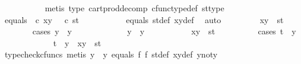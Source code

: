 \begin{isabellebody}
\ \ \ \ \ \ \ \ \ \isamarkupfalse%
\ {\isacharparenleft}{\kern0pt}metis\ {\isasymTheta}{\isacharunderscore}{\kern0pt}type\ cart{\isacharunderscore}{\kern0pt}prod{\isacharunderscore}{\kern0pt}decomp\ cfunc{\isacharunderscore}{\kern0pt}type{\isacharunderscore}{\kern0pt}def\ st{\isacharunderscore}{\kern0pt}type{\isacharparenright}{\kern0pt}\ \ \ \isanewline
\ \ \ \ \ \ \ \isamarkupfalse%
\ equals{}{\isacharcolon}{\kern0pt}\ {\isachardoublequoteopen}{\isasymTheta}\ {\isasymcirc}\isactrlsub c\ {\isasymlangle}x{\isacharcomma}{\kern0pt}y{\isasymrangle}\ {\isacharequal}{\kern0pt}\ {\isasymTheta}\ {\isasymcirc}\isactrlsub c\ {\isasymlangle}s{\isacharcomma}{\kern0pt}t{\isasymrangle}{\isachardoublequoteclose}\isanewline
\ \ \ \ \ \ \ \ \ \isamarkupfalse%
\ equals\ st{\isacharunderscore}{\kern0pt}def\ xy{\isacharunderscore}{\kern0pt}def\ \isamarkupfalse%
\ auto\isanewline
\ \ \ \ \ \ \ \isamarkupfalse%
\ {\isachardoublequoteopen}{\isasymlangle}x{\isacharcomma}{\kern0pt}y{\isasymrangle}\ {\isacharequal}{\kern0pt}\ {\isasymlangle}s{\isacharcomma}{\kern0pt}t{\isasymrangle}{\isachardoublequoteclose}\isanewline
\ \ \ \ \ \ \ \isamarkupfalse%
{\isacharparenleft}{\kern0pt}cases\ {\isachardoublequoteopen}y\ {\isacharequal}{\kern0pt}\ y{}{\isachardoublequoteclose}{\isacharparenright}{\kern0pt}\ \ \isanewline
\ \ \ \ \ \ \ \ \ \isamarkupfalse%
\ {\isachardoublequoteopen}y\ {\isacharequal}{\kern0pt}\ y{}{\isachardoublequoteclose}\isanewline
\ \ \ \ \ \ \ \ \ \isamarkupfalse%
\ {\isachardoublequoteopen}{\isasymlangle}x{\isacharcomma}{\kern0pt}y{\isasymrangle}\ {\isacharequal}{\kern0pt}\ {\isasymlangle}s{\isacharcomma}{\kern0pt}t{\isasymrangle}{\isachardoublequoteclose}\isanewline
\ \ \ \ \ \ \ \ \ \isamarkupfalse%
{\isacharparenleft}{\kern0pt}cases\ {\isachardoublequoteopen}t\ {\isacharequal}{\kern0pt}\ y{}{\isachardoublequoteclose}{\isacharparenright}{\kern0pt}\isanewline
\ \ \ \ \ \ \ \ \ \ \ \isamarkupfalse%
\ {\isachardoublequoteopen}t\ {\isacharequal}{\kern0pt}\ y{}\ {\isasymLongrightarrow}\ {\isasymlangle}x{\isacharcomma}{\kern0pt}y{\isasymrangle}\ {\isacharequal}{\kern0pt}\ {\isasymlangle}s{\isacharcomma}{\kern0pt}t{\isasymrangle}{\isachardoublequoteclose}\isanewline
\ \ \ \ \ \ \ \ \ \ \ \ \ \isamarkupfalse%
\ {\isacharparenleft}{\kern0pt}typecheck{\isacharunderscore}{\kern0pt}cfuncs{\isacharcomma}{\kern0pt}\ metis\ {\isacartoucheopen}y\ {\isacharequal}{\kern0pt}\ y{}{\isacartoucheclose}\ equals\ f{}\ f{}\ st{\isacharunderscore}{\kern0pt}def\ xy{\isacharunderscore}{\kern0pt}def\ y{}{\isacharunderscore}{\kern0pt}not{\isacharunderscore}{\kern0pt}y{}{\isacharparenright}{\kern0pt}\isanewline

\end{isabellebody}

